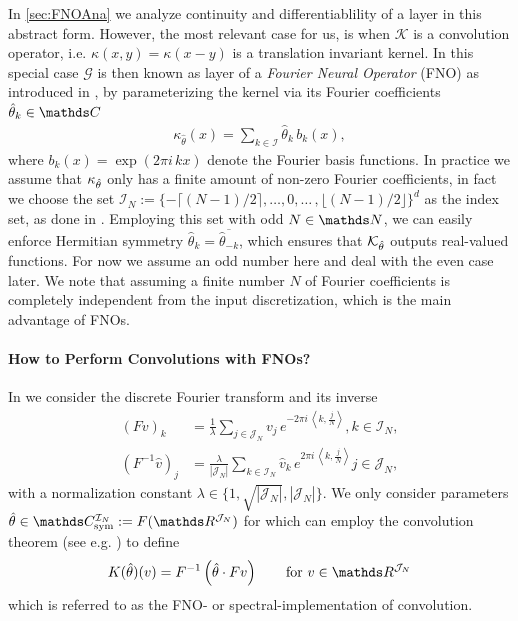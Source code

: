 In \cref{sec:FNOAna} we analyze continuity and differentiablility of a layer in this abstract form. However, the most relevant case for us, is when $\mathcal{K}$ is a convolution operator, i.e. $\kappa(x,y)=\kappa(x-y)$ is a translation invariant kernel. In this special case $\mathcal{G}$ is then known as layer of a \emph{Fourier Neural Operator} (FNO) as introduced in \cite{li2020fourier}, by parameterizing the kernel via its Fourier coefficients $\hat{\param}_k\in\C$
%
\begin{align}\label{eq:fnokernel}
\kappa_{\hat{\theta}}(x) = \sum_{k \in \mathcal{I}} \hat{\theta}_k\, b_k(x),
\end{align}
%
where $b_k(x) = \exp{(2\pi i\, kx)}$ denote the Fourier basis functions. In practice we assume that $\kappa_{\hat{\theta}}$ only has a finite amount of non-zero Fourier coefficients, in fact we choose the set $\mathcal{I}_N := \lbrace -\lceil (N-1)/2\rceil, \ldots,0, \ldots\,, \lfloor (N-1)/2 \rfloor\rbrace^d$ as the index set, as done in \cite{li2020fourier}. Employing this set with odd $N\in\N$, we can easily enforce Hermitian symmetry $\hat{\theta}_k = \overline{\hat{\theta}_{-k}}$, which ensures that $\mathcal{K}_{\hat{\theta}}$ outputs real-valued functions. For now we assume an odd number here and deal with the even case later. We note that assuming a finite number $N$ of Fourier coefficients is completely independent from the input discretization, which is the main advantage of FNOs.
%
%
\paragraph{How to Perform Convolutions with FNOs?}
%
%
In \cite{kabri2023resolution} we consider the discrete Fourier transform and its inverse
%
\begin{align*}
\left(Fv\right)_k &= \frac{1}{\lambda} \sum_{j \in \mathcal{J}_N} v_j\, e^{-2\pi i \, \left\langle k, \frac{j}{N}\right\rangle},  k \in \mathcal{I}_N,\\
%
\left(F^{-1}\hat{v}\right)_j &= \frac{\lambda}{|\mathcal{J}_N|}\sum_{k \in \mathcal{I}_N} \hat{v}_k\, e^{2\pi i \, \left\langle k, \frac{j}{N}\right\rangle} j \in \mathcal{J}_N,
\end{align*}
%
with a normalization constant $\lambda \in \{1, \sqrt{|\mathcal{J}_N|}, |\mathcal{J}_N|\}$. We only consider parameters $\hat\param\in \Csym^{\mathcal{I}_N} := F(\R^{\mathcal{J}_N})$ for which can employ the convolution theorem (see e.g. \cite{grafakos}) to define
%
\begin{align}\label{eq:discfno}
K(\hat{\theta})(v) = F^{-1}\left(\hat{\theta} \cdot Fv\right) \qquad \text{for }v \in \R^{\mathcal{J}_N}
\end{align}
%
which is referred to as the FNO- or spectral-implementation of convolution.
%
%
